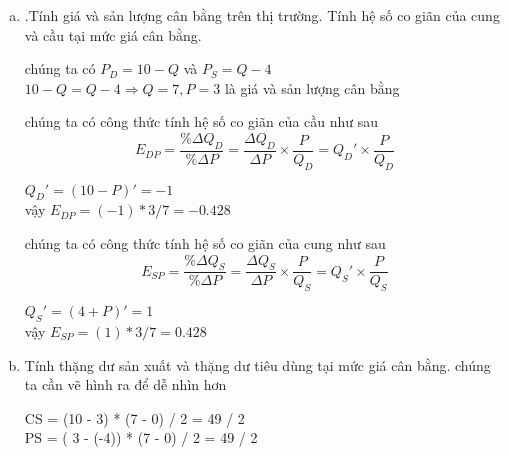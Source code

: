 \begin{enumerate}[a.]
  \item .Tính giá và sản lượng cân bằng trên thị trường. Tính hệ số co giãn của cung và cầu tại
        mức giá cân bằng.

        chúng ta có $P_D = 10 - Q$ và $ P_S = Q - 4$ \\
        $10 -Q = Q - 4 \Rightarrow Q = 7, P = 3 $ là giá và sản lượng cân bằng

        chúng ta có công thức tính hệ số co giãn của cầu như sau
        \[ E_{DP} = \frac{\%\Delta Q_D}{\%\Delta P} =
          \frac{\Delta Q_D}{\Delta P} \times \frac{P}{Q_D} = Q_D' \times \frac{P}{Q_D} \]

        $Q_D' = ( 10 - P)' = -1$ \\
        vậy $E_{DP} = (-1) * 3 / 7 = -0.428 $

        chúng ta có công thức tính hệ số co giãn của cung như sau
        \[ E_{SP} = \frac{\%\Delta Q_S}{\%\Delta P} =
          \frac{\Delta Q_S}{\Delta P} \times \frac{P}{Q_S} = Q_S' \times \frac{P}{Q_S} \]

        $Q_S' = ( 4 + P)' = 1$ \\
        vậy $E_{SP} = (1) * 3 / 7 = 0.428 $

  \item Tính thặng dư sản xuất và thặng dư tiêu dùng tại mức giá cân bằng.
        chúng ta cần vẽ hình ra để dễ nhìn hơn

        CS = (10 - 3) * (7 - 0) / 2 = 49 / 2\\
        PS = ( 3 - (-4))  * (7 - 0) / 2 = 49 / 2\\

\end{enumerate}
